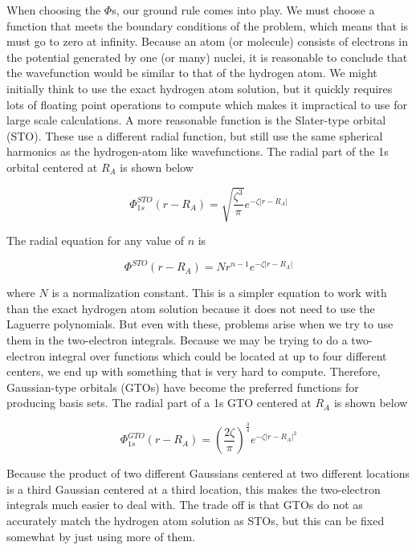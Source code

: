 When choosing the $\Phi$s, our ground rule comes into play. We must choose a function that meets the boundary conditions of the problem, which means that is must go to zero at infinity. Because an atom (or molecule) consists of electrons in the potential generated by one (or many) nuclei, it is reasonable to conclude that the wavefunction would be similar to that of the hydrogen atom. We might initially think to use the exact hydrogen atom solution, but it quickly requires lots of floating point operations to compute which makes it impractical to use for large scale calculations. A more reasonable function is the Slater-type orbital (STO)\cite{PhysRev.36.57}. These use a different radial function, but still use the same spherical harmonics as the hydrogen-atom like wavefunctions. The radial part of the 1s orbital centered at $R_{A}$ is shown below

\begin{equation}
\label{eq:sto_1s}
\Phi^{STO}_{1s}(r - R_{A}) = \sqrt{\frac{\zeta^{3}}{\pi}}e^{-\zeta|r- R_{A}|}
\end{equation}

The radial equation for any value of $n$ is

\begin{equation}
\label{eq:sto_1s_gen}
\Phi^{STO}(r - R_{A}) = Nr^{n-1}e^{-\zeta|r- R_{A}|}
\end{equation}

where $N$ is a normalization constant. This is a simpler equation to work with than the exact hydrogen atom solution because it does not need to use the Laguerre polynomials. But even with these, problems arise when we try to use them in the two-electron integrals. Because we may be trying to do a two-electron integral over functions which could be located at up to four different centers, we end up with something that is very hard to compute. Therefore, Gaussian-type orbitals (GTOs) have become the preferred functions for producing basis sets. The radial part of a 1s GTO centered at $R_{A}$ is shown below\cite{Boys542}

\begin{equation}
\label{eq:gto_1s}
\Phi^{GTO}_{1s}(r - R_{A}) = \left(\frac{2\zeta}{\pi}\right)^{\frac{3}{4}}e^{-\zeta|r- R_{A}|^{2}}
\end{equation}

Because the product of two different Gaussians centered at two different locations is a third Gaussian centered at a third location, this makes the two-electron integrals much easier to deal with. The trade off is that GTOs do not as accurately match the hydrogen atom solution as STOs, but this can be fixed somewhat by just using more of them.

